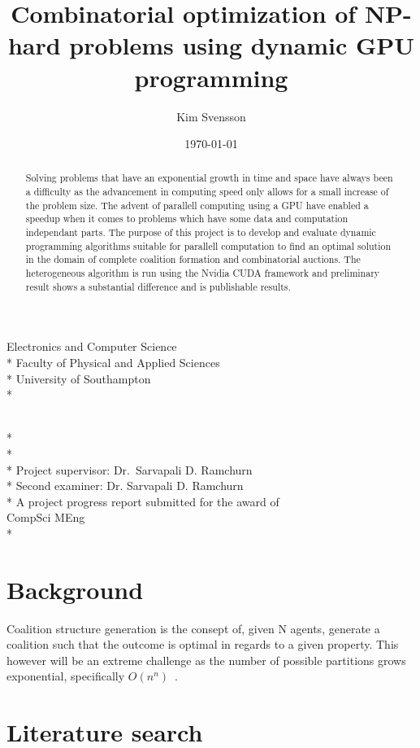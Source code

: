 \documentclass[a4paper, 12pt]{report}
\newcommand{\tdegree}{A project progress report submitted for the award of\\}
\newcommand{\degree}{\tdegree CompSci MEng\\*}
\newcommand{\texam}{Second examiner: }
\newcommand{\exam}{\texam Dr. Sarvapali D. Ramchurn}
\newcommand{\tsupervisor}{Project supervisor: }
\newcommand{\supervisor}{\tsupervisor Dr.\ Sarvapali D. Ramchurn}
\newcommand{\school}{Electronics and Computer Science \\*
Faculty of Physical and Applied Sciences\\*
University of Southampton\\*}
\newenvironment{changemargin}[2]{%
\begin{list}{}{%
\setlength{\topsep}{0pt}%
\setlength{\leftmargin}{#1}%
\setlength{\rightmargin}{#2}%
\setlength{\listparindent}{\parindent}%
\setlength{\itemindent}{\parindent}%
\setlength{\parsep}{\parskip}%
}%
\item[]}{\end{list}}
\begin{document}
\author{Kim Svensson}
\date{\today}
\title{Combinatorial optimization of NP-hard problems using dynamic GPU programming}

\makeatletter
\begin{titlepage}
\begin{changemargin}{-2cm}{-2cm}
\begin{center}
\LARGE\school %

\LARGE
\vfill
\@author \\*
\@date \\*
\doublespacing
\@title \\*
\vfill
\singlespacing
\supervisor \\*
\exam \\*
\vfill
\degree
\end{center} 
\end{changemargin}
\end{titlepage}
\makeatother

\begin{abstract}
Solving problems that have an exponential growth in time and space have always been a difficulty as the advancement in computing speed only allows for a small increase of the problem size. The advent of parallell computing using a GPU have enabled a speedup when it comes to problems which have some data and computation independant parts.
The purpose of this project is to develop and evaluate dynamic programming algorithms suitable for parallell computation to find an optimal solution in the domain of complete coalition formation and combinatorial auctions. The heterogeneous algorithm is run using the Nvidia CUDA framework and preliminary result shows a substantial difference and is publishable results.

\end{abstract}
\chapter*{Background}

Coalition structure generation is the consept of, given N agents, generate a coalition such that the outcome is optimal in regards to a given property. This however will be an extreme challenge as the number of possible partitions grows exponential, specifically $O(n^n)$~\cite{rahwan2008improved}.

\chapter*{Literature search}
\end{document}
